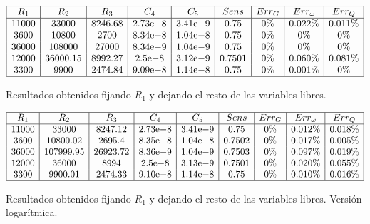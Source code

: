 \documentclass{llncs}
\newcommand{\expnumber}[2]{{#1}\mathrm{e}{#2}}
\begin{document}
	\begin{table}[H]
		$$
		\begin{array}{|c|c|c|c|c|c|c|c|c|c|}
		\hline
		R_1 & R_2 & R_3 & C_4 & C_5 & Sens & Err_G & Err_\omega & Err_Q \\
		\hline
		11000 & 33000 & 8246.68 & \expnumber{2.73}{-8} & \expnumber{3.41}{-9} & 0.75 & 0\% & 0.022\% & 0.011\% \\
		3600 & 10800 & 2700 & \expnumber{8.34}{-8} & \expnumber{1.04}{-8} & 0.75 & 0\% & 0\% & 0\% \\
		36000 & 108000 & 27000 & \expnumber{8.34}{-9} & \expnumber{1.04}{-9} & 0.75 & 0\% & 0\% & 0\% \\
		12000 & 36000.15 & 8992.27 & \expnumber{2.5}{-8} & \expnumber{3.12}{-9} & 0.7501 & 0\% & 0.060\% & 0.081\% \\
		3300 & 9900 & 2474.84 & \expnumber{9.09}{-8} & \expnumber{1.14}{-8} & 0.75 & 0\% & 0.001\% & 0\% \\
		\hline
		\end{array}
		$$
		\caption{Resultados obtenidos fijando $R_1$ y dejando el resto de las variables libres.}
		\label{cuadroSolsCom}
	\end{table}

	\begin{table}[H]
		$$
		\begin{array}{|c|c|c|c|c|c|c|c|c|c|}
		\hline
		R_1 & R_2 & R_3 & C_4 & C_5 & Sens & Err_G & Err_\omega & Err_Q \\
		\hline
		11000 & 33000 & 8247.12 & \expnumber{2.73}{-8} & \expnumber{3.41}{-9} & 0.75 & 0\% & 0.012\% & 0.018\% \\
		3600 & 10800.02 & 2695.4 & \expnumber{8.35}{-8} & \expnumber{1.04}{-8} & 0.7502 & 0\% & 0.017\% & 0.005\% \\
		36000 & 107999.95 & 26923.72 & \expnumber{8.36}{-9} & \expnumber{1.04}{-9} & 0.7503 & 0\% & 0.097\% & 0.019\% \\
		12000 & 36000 & 8994 & \expnumber{2.5}{-8} & \expnumber{3.13}{-9} & 0.7501 & 0\% & 0.020\% & 0.055\% \\
		3300 & 9900.01 & 2474.33 & \expnumber{9.10}{-8} & \expnumber{1.14}{-8} & 0.75 & 0\% & 0.010\% & 0.016\% \\
		\hline
		\end{array}
		$$
		\caption{Resultados obtenidos fijando $R_1$ y dejando el resto de las variables libres. Versión logarítmica.}
		\label{cuadroSolsLog}
	\end{table}
	
\end{document}
